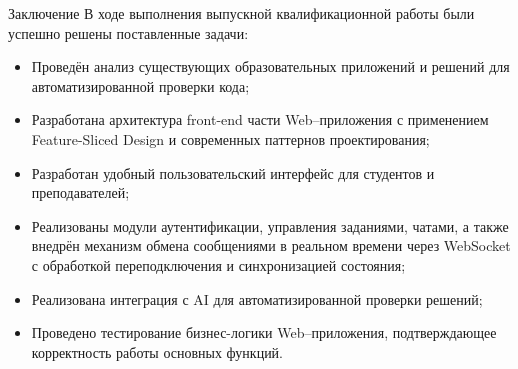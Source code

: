\documentclass[aspectratio=169]{beamer}
\begin{document}
\begin{frame}{Заключение}
\small
В ходе выполнения выпускной квалификационной работы были успешно решены поставленные задачи:

\begin{itemize}
  \item Проведён анализ существующих образовательных приложений и решений для автоматизированной проверки кода;
  \item Разработана архитектура front-end части Web–приложения с применением Feature-Sliced Design и современных паттернов проектирования;
  \item Разработан удобный пользовательский интерфейс для студентов и преподавателей;
  \item Реализованы модули аутентификации, управления заданиями, чатами, а также внедрён механизм обмена сообщениями в реальном времени через WebSocket с обработкой переподключения и синхронизацией состояния;
  \item Реализована интеграция с AI для автоматизированной проверки решений;
  \item Проведено тестирование бизнес-логики Web–приложения, подтверждающее корректность работы основных функций.
\end{itemize}
\end{frame}
\end{document}

